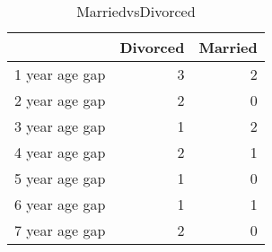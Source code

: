 \begin{table}[ht]
\centering
\begin{tabular}{rrr}
  \hline
 & Divorced & Married \\ 
  \hline
1 year age gap &   3 &   2 \\ 
  2 year age gap &   2 &   0 \\ 
  3 year age gap &   1 &   2 \\ 
  4 year age gap &   2 &   1 \\ 
  5 year age gap &   1 &   0 \\ 
  6 year age gap &   1 &   1 \\ 
  7 year age gap &   2 &   0 \\ 
   \hline
\end{tabular}
\caption{MarriedvsDivorced} 
\label{tab:MarriedvsDivorced}
\end{table}
